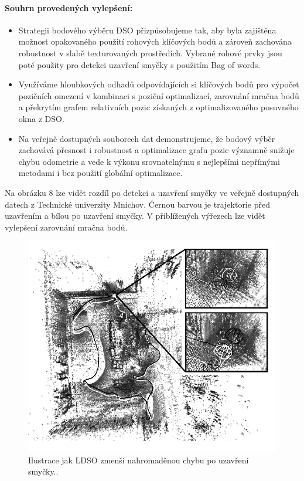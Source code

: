 \documentclass[12pt,a4paper]{report}
\begin{document}
\paragraph*{Souhrn provedených vylepšení:}
\begin{itemize}
\item Strategii bodového výběru DSO přizpůsobujeme tak, aby byla zajištěna možnost opakovaného použití rohových klíčových bodů a zároveň zachována robustnost v slabě texturovaných prostředích. Vybrané rohové prvky jsou poté použity pro detekci uzavření smyčky s použitím Bag of words.
\item Využíváme hloubkových odhadů odpovídajících si klíčových bodů pro výpočet \newline pozičních omezení v kombinaci s poziční optimalizací, zarovnání mračna bodů a překrytím grafem relativních pozic získaných z optimalizovaného posuvného okna z DSO.
\item Na veřejně dostupných souborech dat demonstrujeme, že bodový výběr zachovává přesnost i robustnost a optimalizace grafu pozic významně snižuje chybu odometrie a vede k výkonu srovnatelnýmu s nejlepšími nepřímými metodami i bez použití globální optimalizace.
\end{itemize}

Na obrázku 8 lze vidět rozdíl po detekci a uzavření smyčky ve veřejně dostupných datech z Technické univerzity Mnichov. Černou barvou je trajektorie před uzavřením a bílou po uzavření smyčky. V přiblížených výřezech lze vidět vylepšení zarovnání mračna bodů.

\begin{figure}[H]
\centering
\includegraphics[scale=0.75]{img/Obr6_b.png}
\caption{Ilustrace jak LDSO zmenší nahromaděnou chybu po uzavření smyčky.\cite{LDSO}.}
\end{figure}
\end{document}

